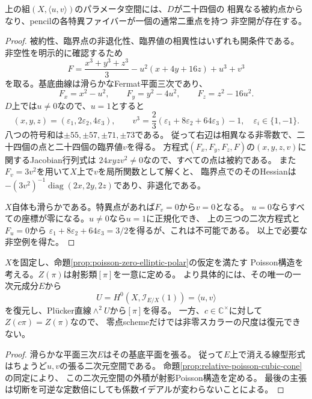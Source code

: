 \begin{proposition}[被約な二十四点を持つ非空開]
\label{prop:poisson-zero-lefschetz-open}
上の組$(X,\langle u,v\rangle)$のパラメータ空間には、$D$が二十四個の
相異なる被約点からなり、pencilの各特異ファイバーが一個の通常二重点を持つ
非空開が存在する。
\end{proposition}

\begin{proof}
被約性、臨界点の非退化性、臨界値の相異性はいずれも開条件である。
非空性を明示的に確認するため
\[
 F=\frac{x^3+y^3+z^3}{3}-u^2(x+4y+16z)+u^3+v^3
\]
を取る。基底曲線は滑らかなFermat平面三次であり、
\[
 F_x=x^2-u^2,\qquad F_y=y^2-4u^2,\qquad F_z=z^2-16u^2.
\]
$D$上では$u\ne0$なので、$u=1$とすると
\[
 (x,y,z)=(\varepsilon_1,2\varepsilon_2,4\varepsilon_3),\qquad
 v^3=\frac23(\varepsilon_1+8\varepsilon_2+64\varepsilon_3)-1,
 \quad \varepsilon_i\in\{1,-1\}.
\]
八つの符号和は$\pm55,\pm57,\pm71,\pm73$である。
従って右辺は相異なる非零数で、二十四個の点と二十四個の臨界値$v$を得る。
方程式$(F_x,F_y,F_z,F)$の$(x,y,z,v)$に関するJacobian行列式は
$24xyzv^2\ne0$なので、すべての点は被約である。
また$F_v=3v^2$を用いて$X$上で$v$を局所関数として解くと、
臨界点でのそのHessianは
$-(3v^2)^{-1}\operatorname{diag}(2x,2y,2z)$であり、非退化である。

$X$自体も滑らかである。特異点があれば$F_v=0$から$v=0$となる。
$u=0$ならすべての座標が零になる。$u\ne0$なら$u=1$に正規化でき、
上の三つの二次方程式と$F_u=0$から
$\varepsilon_1+8\varepsilon_2+64\varepsilon_3=3/2$を得るが、これは不可能である。
以上で必要な非空例を得た。
\end{proof}

\begin{proposition}[零点曲線による射影Poisson構造の復元]
\label{prop:poisson-zero-projective-recovery}
$X$を固定し、命題\ref{prop:poisson-zero-elliptic-polar}の仮定を満たす
Poisson構造を考える。$Z(\pi)$は射影類$[\pi]$を一意に定める。
より具体的には、その唯一の一次元成分$E$から
\[
 U=H^0(X,\mathcal I_{E/X}(1))=\langle u,v\rangle
\]
を復元し、Pl\"ucker直線$\wedge^2U$から$[\pi]$を得る。
一方、$c\in\mathbb C^\times$に対して$Z(c\pi)=Z(\pi)$なので、
零点schemeだけでは非零スカラーの尺度は復元できない。
\end{proposition}

\begin{proof}
滑らかな平面三次$E$はその基底平面を張る。
従って$E$上で消える線型形式はちょうど$u,v$の張る二次元空間である。
命題\ref{prop:relative-poisson-cubic-cone}の同定により、
この二次元空間の外積が射影Poisson構造を定める。
最後の主張は切断を可逆な定数倍にしても係数イデアルが変わらないことによる。
\end{proof}


